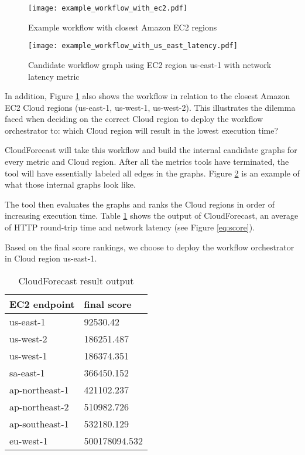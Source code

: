 \documentclass[10pt, conference, compsocconf]{IEEEtran}
\newcommand{\sysname}{CloudForecast\xspace}
\begin{document}
\begin{figure}[!t]
\centering
\texttt{[image: example\_workflow\_with\_ec2.pdf]}

\caption{Example workflow with closest Amazon EC2 regions}
\label{fig:example_workflow_with_ec2}
\end{figure}

\begin{figure}[!t]
\centering
\texttt{[image: example\_workflow\_with\_us\_east\_latency.pdf]}

\caption{Candidate workflow graph using EC2 region us-east-1 with network latency metric}
\label{fig:labeled_candidate_graph}
\end{figure}


In addition, Figure \ref{fig:example_workflow_with_ec2} also shows the workflow in relation to the closest Amazon EC2 Cloud regions (us-east-1, us-west-1, us-west-2). This illustrates the dilemma faced when deciding on the correct Cloud region to deploy the workflow orchestrator to: which Cloud region will result in the lowest execution time?

\sysname will take this workflow and build the internal candidate graphs for every metric and Cloud region. After all the metrics tools have terminated, the tool will have essentially labeled all edges in the graphs. Figure \ref{fig:labeled_candidate_graph} is an example of what those internal graphs look like.



The tool then evaluates the graphs and ranks the Cloud regions in order of increasing execution time. Table \ref{fig:example_result_table} shows the output of \sysname, an average of HTTP round-trip time and network latency (see Figure \ref{eq:score}).

Based on the final score rankings, we choose to deploy the workflow orchestrator in Cloud region us-east-1.




\begin{table}[h]
\renewcommand{\arraystretch}{1.2}
\caption{\sysname result output}
\label{fig:example_result_table}
\centering
\begin{tabular}{|l|l|}
\hline
EC2 endpoint & final score\\
\hline
us-east-1 & 92530.42\\
us-west-2 & 186251.487\\
us-west-1 & 186374.351\\
sa-east-1 & 366450.152\\
ap-northeast-1 & 421102.237\\
ap-northeast-2 & 510982.726 \\
ap-southeast-1 & 532180.129\\
eu-west-1 &500178094.532\\
\hline
\end{tabular}
\end{table}
\end{document}
